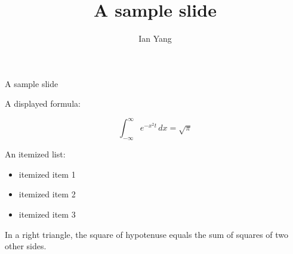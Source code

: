 \documentclass[xetex,mathserif,serif,12pt]{beamer}
\title{A sample slide}
\author{Ian Yang}
\institute{Intridea Inc.}
\begin{document}
\begin{frame}
  \titlepage
\end{frame}

\begin{frame}{A sample slide}

A displayed formula:

\[
  \int_{-\infty}^\infty e^{-x^2t} \, dx = \sqrt{\pi}
\]

An itemized list:

\begin{itemize}
  \item itemized item 1
  \item itemized item 2
  \item itemized item 3
\end{itemize}

\begin{theorem}[test]
  In a right triangle, the square of hypotenuse equals
  the sum of squares of two other sides.
\end{theorem}

\end{frame}
\end{document}
